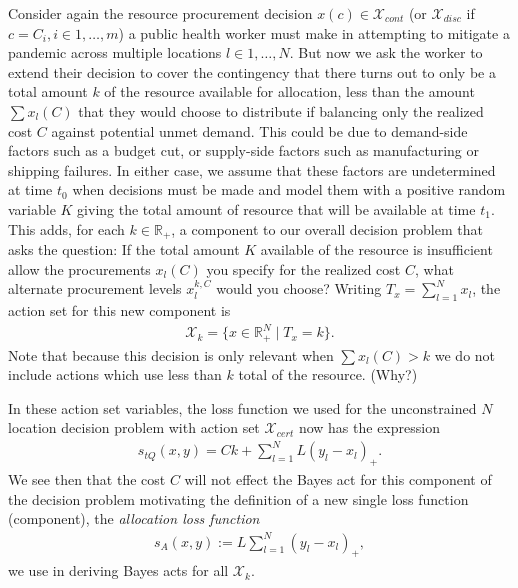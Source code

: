 \documentclass{article}
\begin{document}
Consider again the resource procurement decision $x(c) \in \mathcal{X}_{cont}$ (or $\mathcal{X}_{disc}$ if $c = C_i, i \in 1,\ldots,m$) a public health worker must make in 
attempting to mitigate a pandemic across multiple locations $l \in 1,\ldots,N$.  But now we ask the worker to extend their decision to cover the contingency that there turns out to only be a total amount $k$ of the resource available for allocation, less than the amount $\sum x_l(C)$ that they would choose to distribute if balancing only the realized cost $C$ against potential unmet demand.  This could be due to demand-side factors such as a budget cut, or supply-side factors such as manufacturing or shipping failures. In either case, we assume that these factors are undetermined at time $t_0$ when decisions must be made and model them with a positive random variable $K$ giving the total amount of resource that will be available
at time $t_1$.  This adds, for each $k \in \mathbb{R}_{+}$, a component to our overall decision problem that asks the question: If the total amount $K$ available of the resource is insufficient allow the procurements $x_l(C)$ you specify for the realized cost $C$, what alternate procurement levels $x_l^{k,C}$ would you choose? Writing $T_x = \sum_{l=1}^{N} x_l$, the action set for this new component is 
\begin{align}
\mathcal{X}_k = \{x \in \mathbb{R}_{+}^N \mid T_x = k\}.
\end{align}
Note that because this decision is only relevant when $\sum x_l(C)>k$ we do not include actions which use less than $k$ total of the resource. (Why?)
 
In these action set variables, the loss function we used for the unconstrained $N$ location decision problem with action set $\mathcal{X}_{cert}$ now has the expression
\begin{align}
s_{tQ}\left(x, y\right) = Ck + \sum_{l=1}^{N} L(y_l - x_l)_{+}.
\end{align}
We see then that the cost $C$ will not effect the Bayes act for this component of the decision problem motivating the definition of a new single loss function (component), the \emph{allocation loss function}
\begin{align}
s_{A}(x,y):= L\sum_{l=1}^{N} (y_l - x_l)_{+},
\end{align}
we use in deriving Bayes acts for all $\mathcal{X}_k$.
\end{document}
